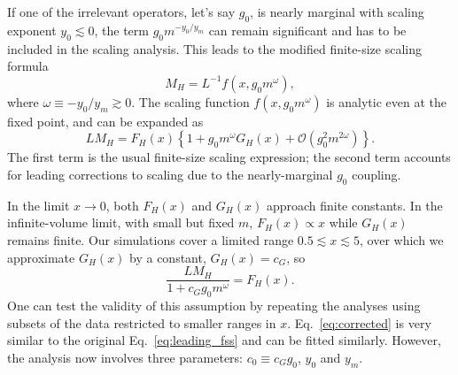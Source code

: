 \documentclass[prl, letterpaper, amsmath, amssymb, preprintnumbers, showpacs, superscriptaddress, twocolumn]{revtex4-1}
\newcommand{\cO}{\ensuremath{\mathcal O} }
\newcommand{\lsim}{\ensuremath{\lesssim} }
\newcommand{\eq}[1]{Eq.~\ref{#1}}
\begin{document}
If one of the irrelevant operators, let's say $g_0$, is nearly marginal with scaling exponent $y_0 \lsim 0$, the term $g_0 m^{-y_0 / y_m}$ can remain significant and has to be included in the scaling analysis.
This leads to the modified finite-size scaling formula
\begin{equation}
  M_H = L^{-1} f\left(x, g_0 m^{\omega}\right),
\end{equation}
where $\omega \equiv -y_0 / y_m \gtrsim 0$.
The scaling function $f\left(x, g_0 m^{\omega}\right)$ is analytic even at the fixed point, and can be expanded as
\begin{equation}
  L M_H = F_H(x)\left\{1 + g_0 m^{\omega} G_H(x) + \cO\left(g_0^2 m^{2\omega}\right)\right\}.
\end{equation}
The first term is the usual finite-size scaling expression; the second term accounts for leading corrections to scaling due to the nearly-marginal $g_0$ coupling.

In the limit $x \to 0$, both $F_H(x)$ and $G_H(x)$ approach finite constants.
In the infinite-volume limit, with small but fixed $m$, $F_H(x)\propto x$ while $G_H(x)$ remains finite.
Our simulations cover a limited range $0.5 \lsim x \lsim 5$, over which we approximate $G_H(x)$ by a constant, $G_H(x) = c_G$, so
\begin{equation}
  \label{eq:corrected}
  \frac{L M_H}{1 + c_G g_0 m^{\omega}} = F_H(x).
\end{equation}
One can test the validity of this assumption by repeating the analyses using subsets of the data restricted to smaller ranges in $x$.
\eq{eq:corrected} is very similar to the original \eq{eq:leading_fss} and can be fitted similarly.
However, the analysis now involves three parameters: $c_0 \equiv c_G g_0$, $y_0$ and $y_m$.
\end{document}

